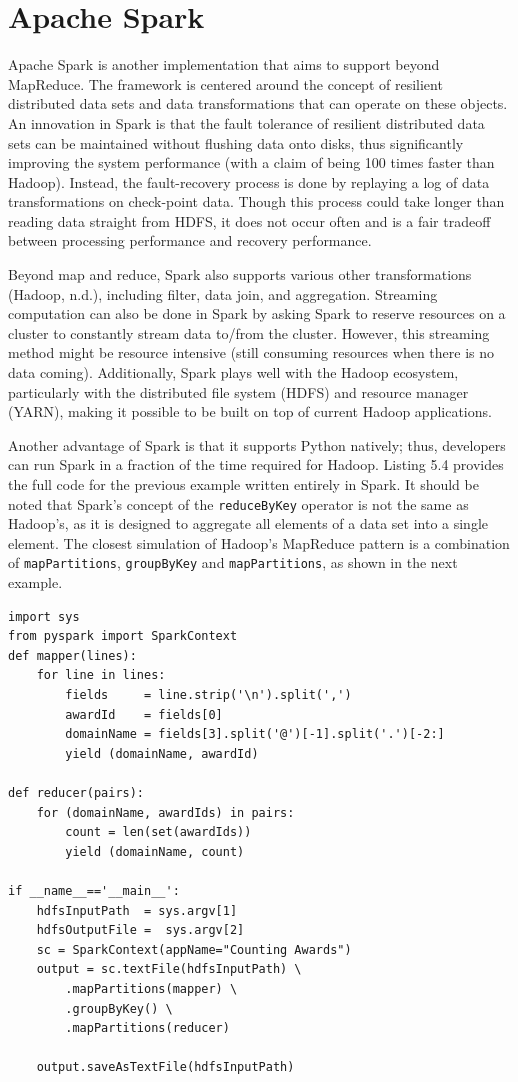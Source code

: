 \documentclass[]{krantz}
\begin{document}
\section{Apache Spark}\label{apache-spark}

Apache Spark is another implementation that aims to support beyond
MapReduce. The framework is centered around the concept of resilient
distributed data sets and data transformations that can operate on these
objects. An innovation in Spark is that the fault tolerance of resilient
distributed data sets can be maintained without flushing data onto
disks, thus significantly improving the system performance (with a claim
of being 100 times faster than Hadoop). Instead, the fault-recovery
process is done by replaying a log of data transformations on
check-point data. Though this process could take longer than reading
data straight from HDFS, it does not occur often and is a fair tradeoff
between processing performance and recovery performance.

Beyond map and reduce, Spark also supports various other transformations
(Hadoop, n.d.), including filter, data join, and aggregation. Streaming
computation can also be done in Spark by asking Spark to reserve
resources on a cluster to constantly stream data to/from the cluster.
However, this streaming method might be resource intensive (still
consuming resources when there is no data coming). Additionally, Spark
plays well with the Hadoop ecosystem, particularly with the distributed
file system (HDFS) and resource manager (YARN), making it possible to be
built on top of current Hadoop applications.

Another advantage of Spark is that it supports Python natively; thus,
developers can run Spark in a fraction of the time required for Hadoop.
Listing 5.4 provides the full code for the previous example written
entirely in Spark. It should be noted that Spark's concept of the
\texttt{reduceByKey} operator is not the same as Hadoop's, as it is
designed to aggregate all elements of a data set into a single element.
The closest simulation of Hadoop's MapReduce pattern is a combination of
\texttt{mapPartitions}, \texttt{groupByKey} and \texttt{mapPartitions},
as shown in the next example.

\hypertarget{lst:spark}{\label{lst:spark}}
\begin{verbatim}
import sys
from pyspark import SparkContext
def mapper(lines):
    for line in lines:
        fields     = line.strip('\n').split(',')
        awardId    = fields[0]
        domainName = fields[3].split('@')[-1].split('.')[-2:]
        yield (domainName, awardId)

def reducer(pairs):
    for (domainName, awardIds) in pairs:
        count = len(set(awardIds))
        yield (domainName, count)

if __name__=='__main__':
    hdfsInputPath  = sys.argv[1]
    hdfsOutputFile =  sys.argv[2]
    sc = SparkContext(appName="Counting Awards")
    output = sc.textFile(hdfsInputPath) \
        .mapPartitions(mapper) \
        .groupByKey() \
        .mapPartitions(reducer)

    output.saveAsTextFile(hdfsInputPath)
\end{verbatim}
\end{document}
